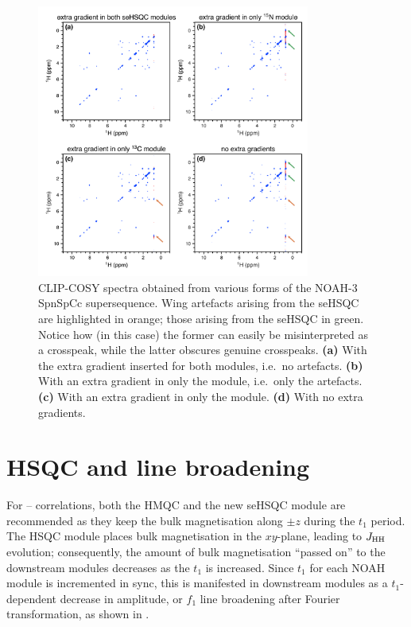 \begin{figure}
    \centering
    \includegraphics[width=0.8\textwidth]{./figures/wing_artefacts.png}
    \caption{
        CLIP-COSY spectra obtained from various forms of the NOAH-3 SpnSpCc supersequence.
        Wing artefacts arising from the \nitrogen{} seHSQC are highlighted in orange; those arising from the \carbon{} seHSQC in green.
        Notice how (in this case) the former can easily be misinterpreted as a crosspeak, while the latter obscures genuine crosspeaks.
        \textbf{(a)} With the extra gradient inserted for both modules, i.e.\ no artefacts.
        \textbf{(b)} With an extra gradient in only the \nitrogen{} module, i.e.\ only the \carbon{} artefacts.
        \textbf{(c)} With an extra gradient in only the \carbon{} module.
        \textbf{(d)} With no extra gradients.
        \grami{}
    }
    \label{fig:wing_artefacts}
\end{figure}


\section{\texorpdfstring{\nitrogen{}}{15N} HSQC and line broadening}

For \nitrogen{}--\proton{} correlations, both the HMQC and the new seHSQC module are recommended as they keep the bulk magnetisation along $\pm z$ during the $t_1$ period.
The HSQC module places bulk magnetisation in the $xy$-plane, leading to $\jhh$ evolution; consequently, the amount of bulk magnetisation ``passed on'' to the downstream modules decreases as the \nitrogen{} $t_1$ is increased.
Since $t_1$ for each NOAH module is incremented in sync, this is manifested in downstream modules as a $t_1$-dependent decrease in amplitude, or $f_1$ line broadening after Fourier transformation, as shown in .

